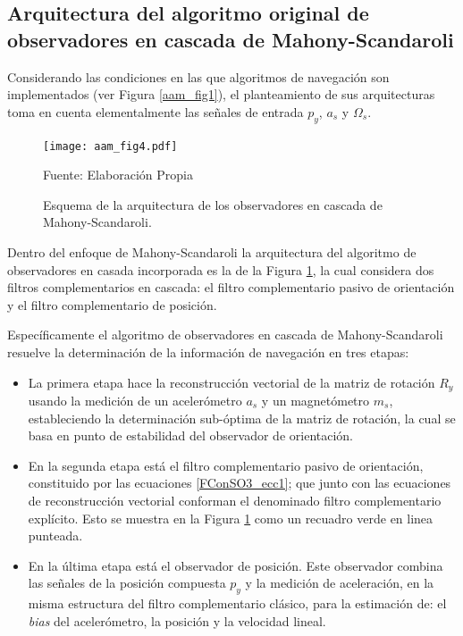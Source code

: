 \documentclass[10pt]{report}
\numberwithin{equation}{chapter}
\numberwithin{algorithm}{chapter}
\begin{document}
\subsection{Arquitectura del algoritmo original de observadores en cascada de Mahony-Scandaroli}
Considerando las condiciones en las que algoritmos de navegación son implementados (ver Figura \ref{aam_fig1}), el planteamiento de sus arquitecturas toma en cuenta elementalmente las señales de entrada $p_y$, $a_s$ y $\Omega_s$.\par
\begin{figure}
\begin{center}
\texttt{[image: aam\_fig4.pdf]}
\caption{Esquema de la arquitectura de los observadores en cascada de Mahony-Scandaroli.}\scriptsize{Fuente: Elaboración Propia}
\label{aam_fig4}
\end{center}
\end{figure}
Dentro del enfoque de Mahony-Scandaroli la arquitectura del algoritmo de observadores en casada incorporada es la de la Figura \ref{aam_fig4}, la cual considera dos filtros complementarios en cascada: el filtro complementario pasivo de orientación y el filtro complementario de posición.\par
Específicamente el algoritmo de observadores en cascada de Mahony-Scandaroli resuelve la determinación de la información de navegación en tres etapas: 
\begin{itemize}
\item La primera etapa hace la reconstrucción vectorial de la matriz de rotación $R_y$ usando la medición de un acelerómetro $a_s$ y un magnetómetro $m_s$, estableciendo la determinación sub-óptima de la matriz de rotación, la cual se basa en punto de estabilidad del observador de orientación.
\item En la segunda etapa está el filtro complementario pasivo de orientación, constituido por las ecuaciones \eqref{FConSO3_ecc1}; que junto con las ecuaciones de reconstrucción vectorial conforman el denominado filtro complementario explícito. Esto se muestra en la Figura \ref{aam_fig4} como un recuadro verde en linea punteada.
\item En la última etapa está el observador de posición. Este observador combina las señales de la posición compuesta $p_y$ y la medición de aceleración, en la misma estructura del filtro complementario clásico, para la estimación de: el \emph{bias} del acelerómetro, la posición y la velocidad lineal.
\end{itemize}
\end{document}
